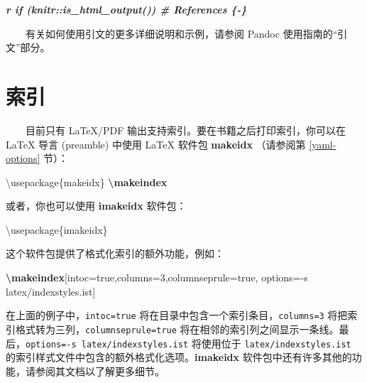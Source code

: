 \documentclass[
  12pt,
]{krantz}
\newenvironment{Shaded}{\begin{snugshade}}{\end{snugshade}}
\newcommand{\BuiltInTok}[1]{#1}
\newcommand{\ExtensionTok}[1]{#1}
\newcommand{\FunctionTok}[1]{\textcolor[rgb]{0.13,0.29,0.53}{\textbf{#1}}}
\newcommand{\InformationTok}[1]{\textcolor[rgb]{0.56,0.35,0.01}{\textbf{\textit{#1}}}}
\newcommand{\NormalTok}[1]{#1}
\theoremstyle{definition}
\theoremstyle{definition}
\theoremstyle{definition}
\theoremstyle{definition}
\theoremstyle{remark}
\begin{document}
\begin{Shaded}
\begin{Highlighting}[]
\InformationTok{\textasciigrave{}r if (knitr::is\_html\_output()) \textquotesingle{}\# References \{{-}\}\textquotesingle{}\textasciigrave{}}
\end{Highlighting}
\end{Shaded}

  有关如何使用引文的更多详细说明和示例，请参阅 Pandoc 使用指南的``引文''部分。

\hypertarget{latex-index}{%
\section{索引}\label{latex-index}}

  目前只有 LaTeX/PDF 输出支持索引。要在书籍之后打印索引，你可以在 LaTeX 导言 (preamble) 中使用 LaTeX 软件包 \textbf{makeidx} （请参阅第 \ref{yaml-options} 节）：

\begin{Shaded}
\begin{Highlighting}[]
\BuiltInTok{\textbackslash{}usepackage}\NormalTok{\{}\ExtensionTok{makeidx}\NormalTok{\}}
\FunctionTok{\textbackslash{}makeindex}
\end{Highlighting}
\end{Shaded}

或者，你也可以使用 \textbf{imakeidx} 软件包：

\begin{Shaded}
\begin{Highlighting}[]
\BuiltInTok{\textbackslash{}usepackage}\NormalTok{\{}\ExtensionTok{imakeidx}\NormalTok{\}}
\end{Highlighting}
\end{Shaded}

这个软件包提供了格式化索引的额外功能，例如：

\begin{Shaded}
\begin{Highlighting}[]
\FunctionTok{\textbackslash{}makeindex}\NormalTok{[intoc=true,columns=3,columnseprule=true,}
\NormalTok{           options={-}s latex/indexstyles.ist]}
\end{Highlighting}
\end{Shaded}

在上面的例子中，\texttt{intoc=true} 将在目录中包含一个索引条目，\texttt{columns=3} 将把索引格式转为三列，\texttt{columnseprule=true} 将在相邻的索引列之间显示一条线。最后，\texttt{options=-s\ latex/indexstyles.ist} 将使用位于 \texttt{latex/indexstyles.ist} 的索引样式文件中包含的额外格式化选项。\textbf{imakeidx} 软件包中还有许多其他的功能，请参阅其文档以了解更多细节。
\end{document}
